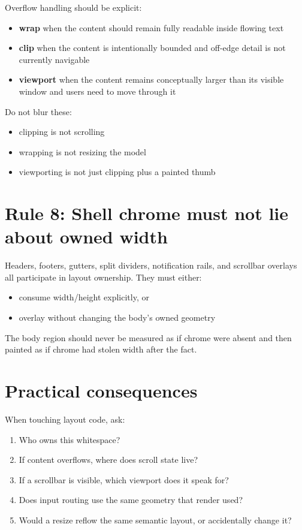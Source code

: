 Overflow handling should be explicit:

\begin{itemize}
\tightlist
\item
  \textbf{wrap} when the content should remain fully readable inside flowing text
\item
  \textbf{clip} when the content is intentionally bounded and off-edge detail is not currently navigable
\item
  \textbf{viewport} when the content remains conceptually larger than its visible window and users need to move through it
\end{itemize}

Do not blur these:

\begin{itemize}
\tightlist
\item
  clipping is not scrolling
\item
  wrapping is not resizing the model
\item
  viewporting is not just clipping plus a painted thumb
\end{itemize}

\section{Rule 8: Shell chrome must not lie about owned width}\label{record-048-rule-8-shell-chrome-must-not-lie-about-owned-width}

Headers, footers, gutters, split dividers, notification rails, and scrollbar overlays all participate in layout ownership. They must either:

\begin{itemize}
\tightlist
\item
  consume width/height explicitly, or
\item
  overlay without changing the body's owned geometry
\end{itemize}

The body region should never be measured as if chrome were absent and then painted as if chrome had stolen width after the fact.

\section{Practical consequences}\label{record-048-practical-consequences}

When touching layout code, ask:

\begin{enumerate}
\def\labelenumi{\arabic{enumi}.}
\tightlist
\item
  Who owns this whitespace?
\item
  If content overflows, where does scroll state live?
\item
  If a scrollbar is visible, which viewport does it speak for?
\item
  Does input routing use the same geometry that render used?
\item
  Would a resize reflow the same semantic layout, or accidentally change it?
\end{enumerate}

